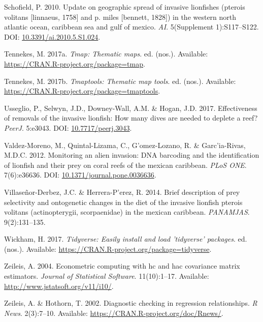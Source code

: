 \documentclass[12pt,]{article}
\begin{document}
\hypertarget{ref-schofield_2010}{}
Schofield, P. 2010. Update on geographic spread of invasive lionfishes
(pterois volitans {[}linnaeus, 1758{]} and p. miles {[}bennett, 1828{]})
in the western north atlantic ocean, caribbean sea and gulf of mexico.
\emph{AI}. 5(Supplement 1):S117--S122. DOI:
\href{https://doi.org/10.3391/ai.2010.5.S1.024}{10.3391/ai.2010.5.S1.024}.

\hypertarget{ref-tmap_2017}{}
Tennekes, M. 2017a. \emph{Tmap: Thematic maps}. ed. (nos.). Available:
\url{https://CRAN.R-project.org/package=tmap}.

\hypertarget{ref-tmaptools_2017}{}
Tennekes, M. 2017b. \emph{Tmaptools: Thematic map tools}. ed. (nos.).
Available: \url{https://CRAN.R-project.org/package=tmaptools}.

\hypertarget{ref-usseglio_2017}{}
Usseglio, P., Selwyn, J.D., Downey-Wall, A.M. \& Hogan, J.D. 2017.
Effectiveness of removals of the invasive lionfish: How many dives are
needed to deplete a reef? \emph{PeerJ}. 5:e3043. DOI:
\href{https://doi.org/10.7717/peerj.3043}{10.7717/peerj.3043}.

\hypertarget{ref-valdezmoreno_2012}{}
Valdez-Moreno, M., Quintal-Lizama, C., G\a'omez-Lozano, R. \&
Garc\a'ia-Rivas, M.D.C. 2012. Monitoring an alien invasion: DNA
barcoding and the identification of lionfish and their prey on coral
reefs of the mexican caribbean. \emph{PLoS ONE}. 7(6):e36636. DOI:
\href{https://doi.org/10.1371/journal.pone.0036636}{10.1371/journal.pone.0036636}.

\hypertarget{ref-villaseorderbez_2014}{}
Villaseñor-Derbez, J.C. \& Herrera-P\a'erez, R. 2014. Brief description
of prey selectivity and ontogenetic changes in the diet of the invasive
lionfish pterois volitans (actinopterygii, scorpaenidae) in the mexican
caribbean. \emph{PANAMJAS}. 9(2):131--135.

\hypertarget{ref-tidyverse_2017}{}
Wickham, H. 2017. \emph{Tidyverse: Easily install and load 'tidyverse'
packages}. ed. (nos.). Available:
\url{https://CRAN.R-project.org/package=tidyverse}.

\hypertarget{ref-sandwich_2014}{}
Zeileis, A. 2004. Econometric computing with hc and hac covariance
matrix estimators. \emph{Journal of Statistical Software}. 11(10):1--17.
Available: \url{http://www.jstatsoft.org/v11/i10/}.

\hypertarget{ref-lmtest_2002}{}
Zeileis, A. \& Hothorn, T. 2002. Diagnostic checking in regression
relationships. \emph{R News}. 2(3):7--10. Available:
\url{https://CRAN.R-project.org/doc/Rnews/}.
\end{document}

